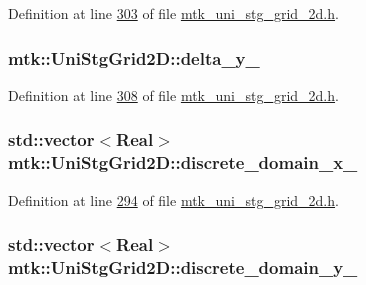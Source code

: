 Definition at line \hyperlink{mtk__uni__stg__grid__2d_8h_source_l00303}{303} of file \hyperlink{mtk__uni__stg__grid__2d_8h_source}{mtk\+\_\+uni\+\_\+stg\+\_\+grid\+\_\+2d.\+h}.

\hypertarget{classmtk_1_1UniStgGrid2D_ace5af3c991f241a895318b9761db73eb}{
\subsubsection[{delta\+\_\+y\+\_\+}]{ mtk\+::\+Uni\+Stg\+Grid2\+D\+::delta\+\_\+y\+\_\+\hspace{0.3cm}{\ttfamily [private]}}}\label{classmtk_1_1UniStgGrid2D_ace5af3c991f241a895318b9761db73eb}


Definition at line \hyperlink{mtk__uni__stg__grid__2d_8h_source_l00308}{308} of file \hyperlink{mtk__uni__stg__grid__2d_8h_source}{mtk\+\_\+uni\+\_\+stg\+\_\+grid\+\_\+2d.\+h}.

\hypertarget{classmtk_1_1UniStgGrid2D_ab15979865852583a46662ea592f27a4f}{
\subsubsection[{discrete\+\_\+domain\+\_\+x\+\_\+}]{\setlength{\rightskip}{0pt plus 5cm}std\+::vector$<${\bf Real}$>$ mtk\+::\+Uni\+Stg\+Grid2\+D\+::discrete\+\_\+domain\+\_\+x\+\_\+\hspace{0.3cm}{\ttfamily [private]}}}\label{classmtk_1_1UniStgGrid2D_ab15979865852583a46662ea592f27a4f}


Definition at line \hyperlink{mtk__uni__stg__grid__2d_8h_source_l00294}{294} of file \hyperlink{mtk__uni__stg__grid__2d_8h_source}{mtk\+\_\+uni\+\_\+stg\+\_\+grid\+\_\+2d.\+h}.

\hypertarget{classmtk_1_1UniStgGrid2D_ad69f93d4b27707d97f209b907383a7a2}{
\subsubsection[{discrete\+\_\+domain\+\_\+y\+\_\+}]{\setlength{\rightskip}{0pt plus 5cm}std\+::vector$<${\bf Real}$>$ mtk\+::\+Uni\+Stg\+Grid2\+D\+::discrete\+\_\+domain\+\_\+y\+\_\+\hspace{0.3cm}{\ttfamily [private]}}}\label{classmtk_1_1UniStgGrid2D_ad69f93d4b27707d97f209b907383a7a2}



